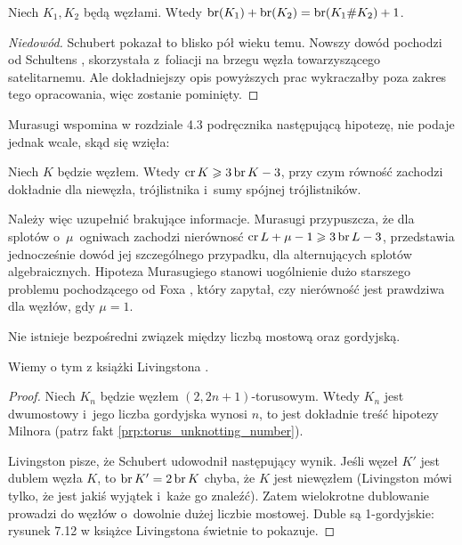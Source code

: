 \begin{proposition}
\label{prp:bridge_additive}%
    Niech $K_1, K_2$ będą węzłami.
    Wtedy $\operatorname{br} (K_1) + \operatorname{br}(K_2) = \operatorname{br}(K_1 \# K_2) + 1$.
\end{proposition}

\begin{proof}[Niedowód]
%
%
    Schubert \cite[s. 279]{schubert1954} pokazał to blisko pół wieku temu.
    Nowszy dowód pochodzi od Schultens \cite{schultens2003}, skorzystała z~foliacji na brzegu węzła towarzyszącego satelitarnemu.
    Ale dokładniejszy opis powyższych prac wykraczałby poza zakres tego opracowania, więc zostanie pominięty.
\end{proof}

Murasugi wspomina w rozdziale 4.3 podręcznika \cite{murasugi1996} następującą hipotezę, nie podaje jednak wcale, skąd się wzięła:
%

\begin{conjecture}
%
    Niech $K$ będzie węzłem.
    Wtedy $\operatorname{cr} K \geqslant 3 \operatorname{br} K - 3$, przy czym równość zachodzi dokładnie dla niewęzła, trójlistnika i~sumy spójnej trójlistników.
\end{conjecture}

Należy więc uzupełnić brakujące informacje.
Murasugi \cite{murasugi1988} przypuszcza, że dla splotów o~$\mu$~ogniwach zachodzi nierównosć $\operatorname{cr} L + \mu - 1 \geqslant 3 \operatorname{br} L - 3$, przedstawia jednocześnie dowód jej szczególnego przypadku, dla alternujących splotów algebraicznych.
%
Hipoteza Murasugiego stanowi uogólnienie dużo starszego problemu pochodzącego od Foxa \cite{fox1950}, który zapytał, czy nierówność jest prawdziwa dla węzłów, gdy $\mu = 1$.
%

\begin{proposition}
%
\label{no_relation_bridge_unknotting}%
    Nie istnieje bezpośredni związek między liczbą mostową oraz gordyjską.
\end{proposition}

Wiemy o tym z książki Livingstona \cite[s. 146]{livingston1993}.

\begin{proof}
    Niech $K_n$ będzie węzłem $(2, 2n+1)$-torusowym.
    Wtedy $K_n$ jest dwumostowy i~jego liczba gordyjska wynosi $n$, to jest dokładnie treść hipotezy Milnora (patrz fakt \ref{prp:torus_unknotting_number}).

    Livingston pisze, że Schubert \cite[s. 281]{schubert1954} udowodnił następujący wynik.
    Jeśli węzeł $K'$ jest dublem węzła $K$, to $\operatorname{br} K' = 2 \operatorname{br} K$ chyba, że $K$ jest niewęzłem (Livingston mówi tylko, że jest jakiś wyjątek i~każe go znaleźć).
    Zatem wielokrotne dublowanie prowadzi do węzłów o~dowolnie dużej liczbie mostowej.
    Duble są 1-gordyjskie: rysunek 7.12 w książce Livingstona \cite[s. 146]{livingston1993} świetnie to pokazuje.
\end{proof}

